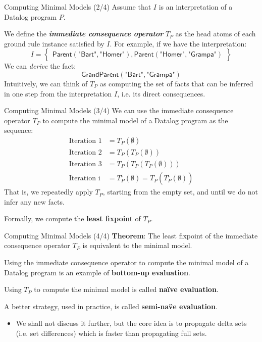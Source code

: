 \begin{frame}{Computing Minimal Models (2/4)}
Assume that $I$ is an interpretation of a Datalog program $P$.

We define the \textbf{\emph{immediate consequence operator}} $T_P$ as the head
atoms of each ground rule instance satisfied by $I$. For example, if we have the
interpretation:
$$
I = \left\{
\begin{array}{l}
\textsf{Parent}(\textsf{"Bart"}, \textsf{"Homer"}), \textsf{Parent}(\textsf{"Homer"}, \textsf{"Grampa"})
\end{array}\right\}
$$
We can \emph{derive} the fact:
$$
\textsf{GrandParent}(\textsf{"Bart"}, \textsf{"Grampa"})
$$
Intuitively, we can think of $T_P$ as computing the set of facts that can be
inferred in one step from the interpretation $I$, i.e. its direct consequences.
\end{frame}

\begin{frame}{Computing Minimal Models (3/4)}
We can use the immediate consequence operator $T_P$ to compute the minimal model
of a Datalog program as the sequence:
%
\begin{align*}
\text{Iteration 1} &= T_P(\emptyset) \\
\text{Iteration 2} &= T_P(T_P(\emptyset)) \\
\text{Iteration 3} &= T_P(T_P(T_P(\emptyset))) \\ 
\text{Iteration i} &= T_P^i(\emptyset) = T_P(T_P^i(\emptyset))
\end{align*}
%
That is, we repeatedly apply $T_P$, starting from the empty set, and until we do
not infer any new facts. 

Formally, we compute the \textbf{least fixpoint} of $T_P$.
\end{frame}

\begin{frame}{Computing Minimal Models (4/4)}
\textbf{Theorem}: The least fixpoint of the immediate consequence operator $T_P$
is equivalent to the minimal model.

\pause

Using the immediate consequence operator to compute the minimal model of a
Datalog program is an example of \textbf{bottom-up evaluation}.

\pause

Using $T_P$ to compute the minimal model is called \textbf{na\"ive
evaluation}.

\pause

A better strategy, used in practice, is called \textbf{semi-na\"ve evaluation}.
\begin{itemize}
    \item We shall not discuss it further, but the core idea is to propagate
    delta sets (i.e. set differences) which is faster than propagating full sets.
\end{itemize}
\end{frame}

